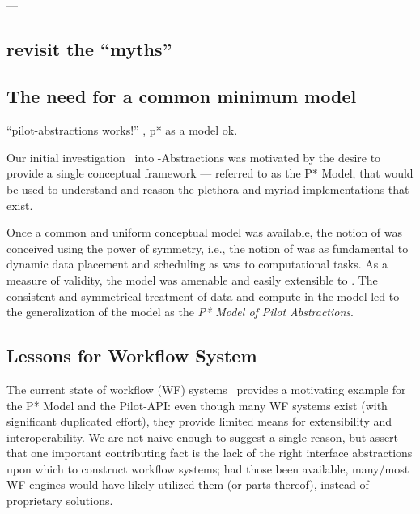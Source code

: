 \documentclass{sig-alternate}
\begin{document}

\\---\\


\subsection{revisit the ``myths''}

\subsection{The need for a common minimum model}

``pilot-abstractions works!'' , p* as a model ok.


Our initial investigation~\cite{Luckow:2008la} into
\pilot-Abstractions was motivated by the desire to provide a single
conceptual framework --- referred to as the P* Model, that would be
used to understand and reason the plethora and myriad \pilotjob
implementations that exist.

 
Once a common and uniform conceptual model was available, the notion
of \pilotdata was conceived using the power of symmetry, i.e., the
notion of \pilotdata was as fundamental to dynamic data placement and
scheduling as \pilotjobs was to computational tasks. As a measure of
validity, the \pstar model was amenable and easily extensible to
\pilotdata.  The consistent and symmetrical treatment of data and
compute in the model led to the generalization of the model as the
{\it P* Model of Pilot Abstractions}.


\subsection{Lessons for Workflow System}

The current state of workflow (WF) systems~\cite{nsf-workflow,1196459}
provides a motivating example for the P* Model and the Pilot-API: even
though many WF systems exist (with significant duplicated effort),
they provide limited means for extensibility and interoperability.  We
are not naive enough to suggest a single reason, but assert that one
important contributing fact is the lack of the right interface
abstractions upon which to construct workflow systems; had those been
available, many/most WF engines would have likely utilized them (or
parts thereof), instead of proprietary solutions.
\end{document}
